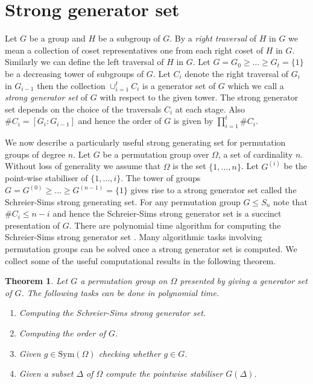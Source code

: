 \documentclass[11pt]{madras}%
\newtheorem{theorem}{Theorem}[chapter]
\theoremstyle{remark}
\newcommand{\Sym}[1]{{\ensuremath{\mathrm{Sym}\left(#1\right)}}}
\newcommand{\pointwise}[2]{{\ensuremath{#1\left(#2\right)}}}
\begin{document}
\section{Strong generator set}

Let $G$ be a group and $H$ be a subgroup of $G$. By a \emph{right
  traversal} of $H$ in $G$ we mean a collection of coset
representatives one from each right coset of $H$ in $G$. Similarly we
can define the left traversal of $H$ in $G$. Let $G =
G_0 \geq \ldots \geq G_t = \{ 1 \}$ be a decreasing tower of subgroups
of $G$. Let $C_i$ denote the right traversal of $G_i$ in $G_{i-1}$
then the collection $\cup_{i=1}^t C_i$ is a generator set of $G$ which
we call a \emph{strong generator set} of $G$ with respect to the given
tower. The strong generator set depends on the choice of the
traversals $C_i$ at each stage. Also $\# C_i = [G_i : G_{i-1}]$ and
hence the order of $G$ is given by $\prod_{i=1}^t \# C_i$.

We now describe a particularly useful strong generating set for
permutation groups of degree $n$.  Let $G$ be a permutation group over
$\Omega$, a set of cardinality $n$. Without loss of generality we
assume that $\Omega$ is the set $\{ 1 ,\ldots , n\}$. Let $G^{(i)}$ be
the point-wise stabiliser of $\{1,\ldots,i\}$. The tower of groups $G
= G^{(0)} \geq \ldots \geq G^{(n-1)} = \{ 1 \}$ gives rise to a strong
generator set called the Schreier-Sims strong generating set.  For any
permutation group $G \leq S_n$ note that $\# C_i \leq n - i$ and hence
the Schreier-Sims strong generator set is a succinct presentation of
$G$. There are polynomial time algorithm for computing the
Schreier-Sims strong generator set
\cite{sims70computational,sims78some,furst80polynomialtime}.  Many
algorithmic tasks involving permutation groups can be solved once a
strong generator set is computed. We collect some of the useful
computational results in the following theorem.

\begin{theorem}\label{thm-schreiersims}
  Let $G$ a permutation group on $\Omega$ presented by giving a
  generator set of $G$. The following tasks can be done in polynomial
  time.
  \begin{enumerate}
  \item Computing the Schreier-Sims strong generator set.
  \item Computing the order of $G$.
  \item Given $g \in \Sym{\Omega}$ checking whether $g \in G$.
  \item Given a subset $\Delta$ of $\Omega$ compute the pointwise
    stabiliser $\pointwise{G}{\Delta}$.
  \end{enumerate}
\end{theorem}
\end{document}
